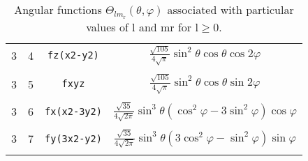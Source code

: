 \begin{table}
\begin{center}
\begin{tabular}{|cccc|}
 3  &  4  &  \verb#fz(x2-y2)# & 
$\frac{\sqrt{105}}{4\sqrt{\pi}}\sin^{2}\theta\cos\theta\cos2\varphi$\\
&&&\\
 3  &  5  &  \verb#fxyz# & 
$\frac{\sqrt{105}}{4\sqrt{\pi}}\sin^{2}\theta\cos\theta\sin2\varphi$\\
&&&\\
 3  &  6  &  \verb#fx(x2-3y2)# & 
$\frac{\sqrt{35}}{4\sqrt{2\pi}}\sin^{3}\theta(\cos^{2}\varphi-3\sin^{2}\varphi)\cos\varphi$\\
&&&\\
 3  &  7  &  \verb#fy(3x2-y2)# & 
$\frac{\sqrt{35}}{4\sqrt{2\pi}}\sin^{3}\theta(3\cos^{2}\varphi-\sin^{2}\varphi)\sin\varphi$\\
&&&\\\hline\hline
\end{tabular}
\caption{Angular functions
$\Theta_{lm_{\mathrm{r}}}(\theta,\varphi)$
associated with particular values of l and mr for
l$\ge0$.
\label{tab:angular}}
\end{center}
\end{table}


